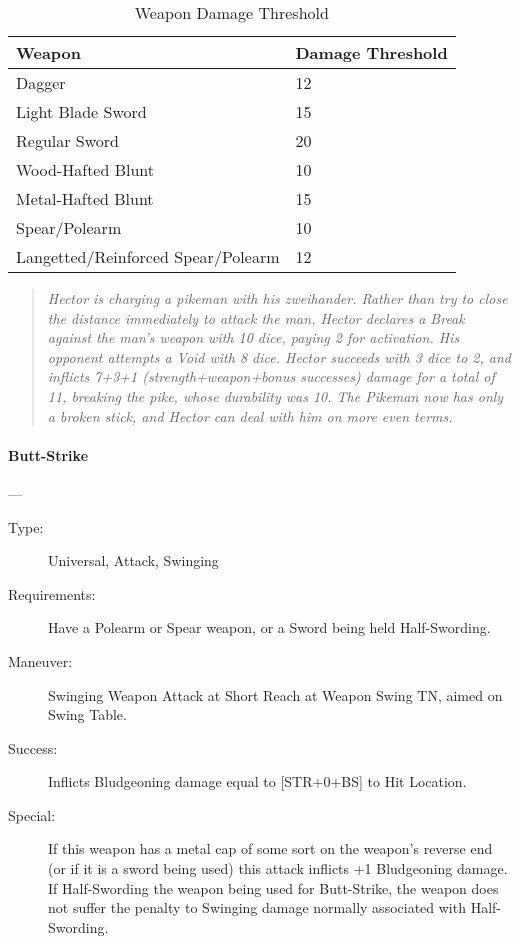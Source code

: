 \documentclass[oneside,11pt,english]{book}
\begin{document}
\begin{table}[!hb]
	\centering
	\caption{Weapon Damage Threshold}
	\label{tab:Weapon Damage Threshold}
	\begin{tabu} spread 0pt {XX[-1,r]}
Weapon&Damage Threshold \\\toprule
Dagger&12\\
Light Blade Sword &15 \\
Regular Sword &20 \\
Wood-Hafted Blunt &10 \\
Metal-Hafted Blunt&15 \\
Spear/Polearm&10\\
Langetted/Reinforced Spear/Polearm&12 \\
	\end{tabu}
\end{table}

\begin{quotation}
\emph{Hector is charging a pikeman with his zweihander. Rather than try to close the distance immediately to attack the man, Hector declares a Break against the man’s weapon with 10 dice, paying 2 for activation. His opponent attempts a Void with 8 dice. Hector succeeds with 3 dice to 2, and inflicts 7+3+1 (strength+weapon+bonus successes) damage for a total of 11, breaking the pike, whose durability was 10. The Pikeman now has only a broken stick, and Hector can deal with him on more even terms.}
\end{quotation}


\paragraph{\large\label{man:Butt-Strike}Butt-Strike}---\quad{\large[X]}
\begin{description}
\item [Type:] Universal, Attack, Swinging 
\item [Requirements:] Have a Polearm or Spear weapon, or a Sword being held Half-Swording. 
\item [Maneuver:] Swinging Weapon Attack at Short Reach at Weapon Swing TN, aimed on Swing Table. 
\item [Success:] Inflicts Bludgeoning damage equal to [STR+0+BS] to Hit Location. 
\item [Special:] If this weapon has a metal cap of some sort on the weapon’s reverse end (or if it is a sword being used) this attack inflicts +1 Bludgeoning damage.  If Half-Swording the weapon being used for Butt-Strike, the weapon does not suffer the penalty to Swinging damage normally associated with Half-Swording. 
\end{description}
\end{document}
